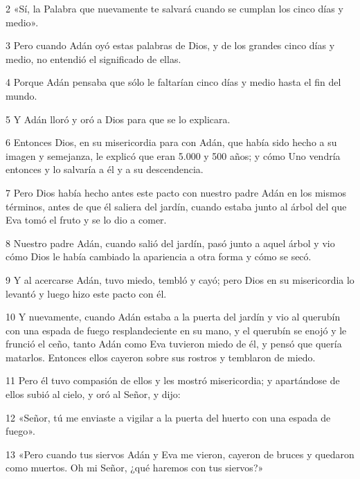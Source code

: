 \par 2 «Sí, la Palabra que nuevamente te salvará cuando se cumplan los cinco días y medio».

\par 3 Pero cuando Adán oyó estas palabras de Dios, y de los grandes cinco días y medio, no entendió el significado de ellas.

\par 4 Porque Adán pensaba que sólo le faltarían cinco días y medio hasta el fin del mundo.

\par 5 Y Adán lloró y oró a Dios para que se lo explicara.

\par 6 Entonces Dios, en su misericordia para con Adán, que había sido hecho a su imagen y semejanza, le explicó que eran 5.000 y 500 años; y cómo Uno vendría entonces y lo salvaría a él y a su descendencia.

\par 7 Pero Dios había hecho antes este pacto con nuestro padre Adán en los mismos términos, antes de que él saliera del jardín, cuando estaba junto al árbol del que Eva tomó el fruto y se lo dio a comer.

\par 8 Nuestro padre Adán, cuando salió del jardín, pasó junto a aquel árbol y vio cómo Dios le había cambiado la apariencia a otra forma y cómo se secó.

\par 9 Y al acercarse Adán, tuvo miedo, tembló y cayó; pero Dios en su misericordia lo levantó y luego hizo este pacto con él.

\par 10 Y nuevamente, cuando Adán estaba a la puerta del jardín y vio al querubín con una espada de fuego resplandeciente en su mano, y el querubín se enojó y le frunció el ceño, tanto Adán como Eva tuvieron miedo de él, y pensó que quería matarlos. Entonces ellos cayeron sobre sus rostros y temblaron de miedo.

\par 11 Pero él tuvo compasión de ellos y les mostró misericordia; y apartándose de ellos subió al cielo, y oró al Señor, y dijo:

\par 12 «Señor, tú me enviaste a vigilar a la puerta del huerto con una espada de fuego».

\par 13 «Pero cuando tus siervos Adán y Eva me vieron, cayeron de bruces y quedaron como muertos. Oh mi Señor, ¿qué haremos con tus siervos?»

